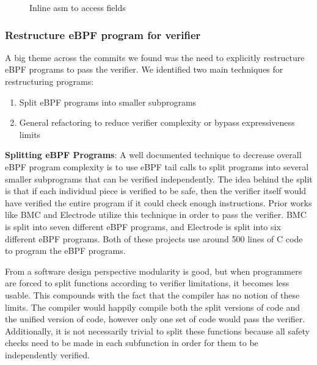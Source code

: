 \begin{figure}
    
    \caption{Inline asm to access fields}
    \label{fig:inline-asm}
\end{figure}


\subsubsection{Restructure eBPF program for verifier}
A big theme across the commits we found was the need to explicitly restructure eBPF programs to pass the verifier.
We identified two main techniques for restructuring programs:

\begin{enumerate}
    \item Split eBPF programs into smaller subprograms
    \item General refactoring to reduce verifier complexity or bypass expressiveness limits
\end{enumerate}

\noindent\textbf{Splitting eBPF Programs}:
A well documented technique to decrease overall eBPF program complexity is to use eBPF tail calls to split programs into several smaller subprograms that can be verified independently.
The idea behind the split is that if each individual piece is verified to be safe, then the verifier itself would have verified the entire program if it could check enough instructions.
Prior works like BMC\cite{BMC} and Electrode\cite{Electrode} utilize this technique in order to pass the verifier.
BMC is split into seven different eBPF programs, and Electrode is split into six different eBPF programs.
Both of these projects use around 500 lines of C code to program the eBPF programs.

From a software design perspective modularity is good, but when programmers are forced to split functions according to verifier limitations, it becomes less usable.
This compounds with the fact that the compiler has no notion of these limits.
The compiler would happily compile both the split versions of code and the unified version of code, however only one set of code would pass the verifier.
Additionally, it is not necessarily trivial to split these functions because all safety checks need to be made in each subfunction in order for them to be independently verified.

